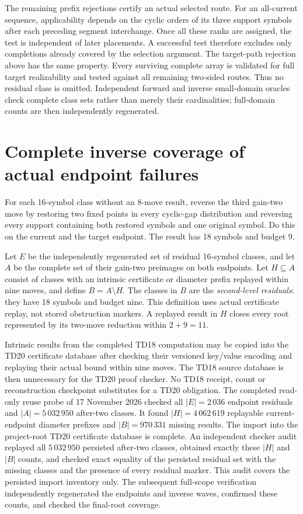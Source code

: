 \documentclass[11pt,a4paper]{article}
\begin{document}
The remaining prefix rejections certify an actual selected route. For an
all-current sequence, applicability depends on the cyclic orders of its three
support symbols after each preceding segment interchange. Once all these ranks
are assigned, the test is independent of later placements. A successful test
therefore excludes only completions already covered by the selection argument.
The target-path rejection above has the same property. Every surviving complete
array is validated for full target realizability and tested against all
remaining two-sided routes. Thus no residual class is omitted. Independent
forward and inverse small-domain oracles check complete class sets rather than
merely their cardinalities; full-domain counts are then independently regenerated.

\section{Complete inverse coverage of actual endpoint failures}
For each 16-symbol class without an 8-move result, reverse the
third gain-two move by restoring two fixed points in every cyclic-gap
distribution and reversing every support containing both restored symbols and
one original symbol. Do this on the current and the target endpoint. The
result has 18 symbols and budget 9.

Let $E$ be the independently regenerated set of residual 16-symbol classes,
and let $A$ be the complete set of their gain-two preimages on both endpoints.
Let $H\subseteq A$ consist of classes with an intrinsic certificate or diameter
prefix replayed within nine moves, and define $B=A\setminus H$.
The classes in $B$ are the \emph{second-level residuals}: they have 18 symbols
and budget nine. This definition uses actual certificate replay, not stored
obstruction markers. A replayed result in $H$ closes every root represented by
its two-move reduction within $2+9=11$.

Intrinsic results from the completed TD18 computation may be copied into the
TD20 certificate database after checking their versioned key/value encoding
and replaying their actual bound within nine moves. The TD18 source database
is then unnecessary for the TD20 proof checker. No TD18 receipt, count
or reconstruction checkpoint substitutes for a TD20 obligation.
The completed read-only reuse probe of 17 November 2026 checked all
$|E|=2\,036$ endpoint residuals and $|A|=5\,032\,950$ after-two classes.
It found $|H|=4\,062\,619$ replayable current-endpoint diameter prefixes and
$|B|=970\,331$ missing results. The import into the project-root TD20
certificate database is complete. An independent checker audit replayed
all $5\,032\,950$ persisted after-two classes, obtained exactly these
$|H|$ and $|B|$ counts, and checked exact equality of the persisted residual
set with the missing classes and the presence of every residual marker.
This audit covers the persisted import inventory only. The subsequent full-scope
verification independently regenerated the endpoints and inverse waves,
confirmed these counts, and checked the final-root coverage.
\end{document}
